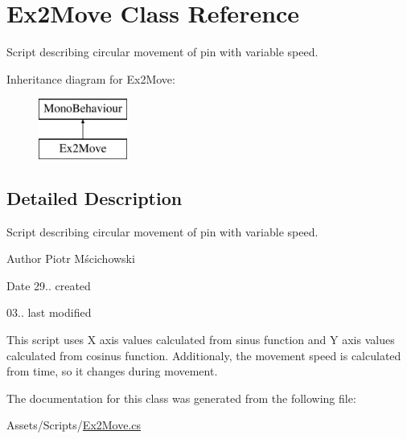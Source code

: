\hypertarget{class_ex2_move}{}\section{Ex2\+Move Class Reference}
\label{class_ex2_move}


Script describing circular movement of pin with variable speed.  


Inheritance diagram for Ex2\+Move\+:\begin{figure}[H]
\begin{center}
\leavevmode
\includegraphics[height=2.000000cm]{class_ex2_move}
\end{center}
\end{figure}


\subsection{Detailed Description}
Script describing circular movement of pin with variable speed. 

\begin{DoxyAuthor}{Author}
Piotr Mścichowski 
\end{DoxyAuthor}
\begin{DoxyDate}{Date}
29.. created 

03.. last modified
\end{DoxyDate}
This script uses X axis values calculated from sinus function and Y axis values calculated from cosinus function. Additionaly, the movement speed is calculated from time, so it changes during movement. 

The documentation for this class was generated from the following file\+:\begin{DoxyCompactItemize}
\item 
Assets/\+Scripts/\hyperlink{_ex2_move_8cs}{Ex2\+Move.\+cs}\end{DoxyCompactItemize}
